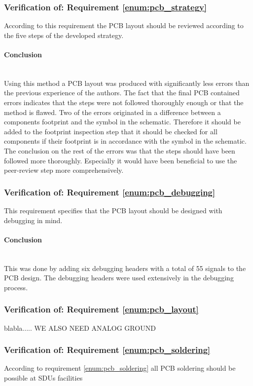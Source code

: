 \subsubsection{Verification of: Requirement \ref{enum:pcb_strategy}} %
\label{ssub:requirement_enum:pcb_strategy}
According to this requirement the PCB layout should be reviewed according to the five steps of the developed strategy.
\paragraph{Conclusion}~\\
Using this method a PCB layout was produced with significantly less errors than the previous experience of the authors.
The fact that the final PCB contained errors indicates that the steps were not followed thoroughly enough or that the method is flawed.
Two of the errors originated in a difference between a components footprint and the symbol in the schematic.
Therefore it should be added to the footprint inspection step that it should be checked for all components if their footprint is in accordance with the symbol in the schematic.
The conclusion on the rest of the errors was that the steps should have been followed more thoroughly.
Especially it would have been beneficial to use the peer-review step more comprehensively.

\subsubsection{Verification of: Requirement \ref{enum:pcb_debugging}} %
\label{ssub:requirement_enum:pcb_debugging}
This requirement specifies that the PCB layout should be designed with debugging in mind.
\paragraph{Conclusion}~\\
This was done by adding six debugging headers with a total of 55 signals to the PCB design.
The debugging headers were used extensively in the debugging process.

\subsubsection{Verification of: Requirement \ref{enum:pcb_layout}} %
\label{ssub:requirement_enum:pcb_layout}
blabla.....
WE ALSO NEED ANALOG GROUND

\subsubsection{Verification of: Requirement \ref{enum:pcb_soldering}} %
\label{ssub:requirement_enum:pcb_soldering}
According to requirement \ref{enum:pcb_soldering} all PCB soldering should be possible at SDUs facilities
